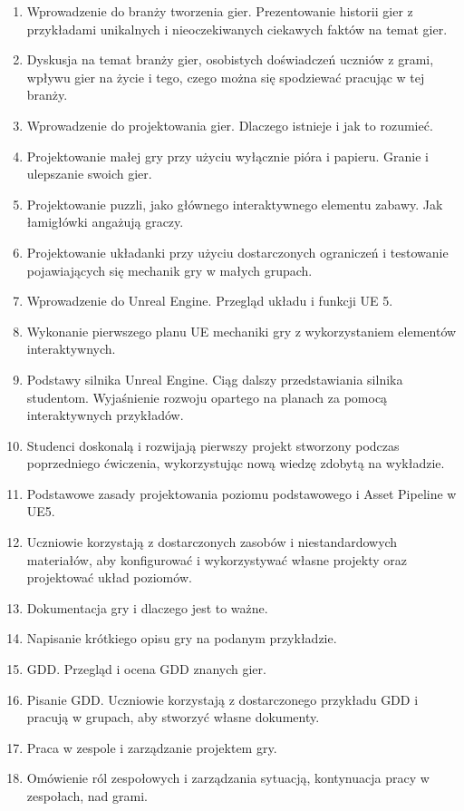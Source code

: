 \documentclass[12pt, a4paper]{article}
\begin{document}
\begin{enumerate}
  \item Wprowadzenie do branży tworzenia gier. Prezentowanie historii gier z przykładami unikalnych i nieoczekiwanych ciekawych faktów na temat gier.
  \item Dyskusja na temat branży gier, osobistych doświadczeń uczniów z grami, wpływu gier na życie i tego, czego można się spodziewać pracując w tej branży.
  \item Wprowadzenie do projektowania gier. Dlaczego istnieje i jak to rozumieć.
  \item Projektowanie małej gry przy użyciu wyłącznie pióra i papieru. Granie i ulepszanie swoich gier.
  \item Projektowanie puzzli, jako głównego interaktywnego elementu zabawy. Jak łamigłówki angażują graczy.
  \item Projektowanie układanki przy użyciu dostarczonych ograniczeń i testowanie pojawiających się mechanik gry w małych grupach.
  \item Wprowadzenie do Unreal Engine. Przegląd układu i funkcji UE 5.
  \item Wykonanie pierwszego planu UE mechaniki gry z wykorzystaniem elementów interaktywnych.
  \item Podstawy silnika Unreal Engine. Ciąg dalszy przedstawiania silnika studentom. Wyjaśnienie rozwoju opartego na planach za pomocą interaktywnych przykładów.
  \item Studenci doskonalą i rozwijają pierwszy projekt stworzony podczas poprzedniego ćwiczenia, wykorzystując nową wiedzę zdobytą na wykładzie.
  \item Podstawowe zasady projektowania poziomu podstawowego i Asset Pipeline w UE5.
  \item Uczniowie korzystają z dostarczonych zasobów i niestandardowych materiałów, aby konfigurować i wykorzystywać własne projekty oraz projektować układ poziomów.
  \item Dokumentacja gry i dlaczego jest to ważne.
  \item Napisanie krótkiego opisu gry na podanym przykładzie.
  \item GDD. Przegląd i ocena GDD znanych gier.
  \item Pisanie GDD. Uczniowie korzystają z dostarczonego przykładu GDD i pracują w grupach, aby stworzyć własne dokumenty.
  \item Praca w zespole i zarządzanie projektem gry.
  \item Omówienie ról zespołowych i zarządzania sytuacją, kontynuacja pracy w zespołach, nad grami.

\end{enumerate}
\end{document}
